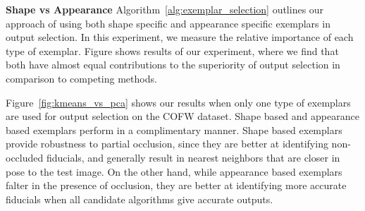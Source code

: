 \textbf{Shape vs Appearance}
\label{subsec:shape_vs_appearance}
Algorithm~\ref{alg:exemplar_selection} outlines our approach of using both shape specific and
appearance specific exemplars in output selection. In this experiment, we measure the relative
importance of each type of exemplar. Figure shows results of our
experiment, where we find that both have almost equal contributions to the superiority of 
output selection in comparison to competing methods.
 
Figure~\ref{fig:kmeans_vs_pca} shows our results when only one type of exemplars are used
for output selection on the COFW dataset. Shape based and appearance based exemplars perform in a complimentary manner.
Shape based exemplars provide robustness to partial occlusion, since they are better at identifying
non-occluded fiducials, and generally result in nearest neighbors that are closer in pose to the
test image. On the other hand, while appearance based exemplars falter in the presence of occlusion,
they are better at identifying more accurate fiducials when all candidate algorithms give accurate outputs.

